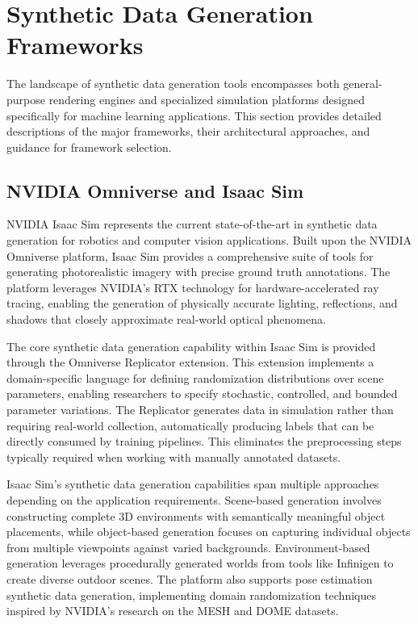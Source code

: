 \section{Synthetic Data Generation Frameworks}
\label{sec:frameworks}

The landscape of synthetic data generation tools encompasses both general-purpose rendering engines and specialized simulation platforms designed specifically for machine learning applications. This section provides detailed descriptions of the major frameworks, their architectural approaches, and guidance for framework selection.

\subsection{NVIDIA Omniverse and Isaac Sim}

NVIDIA Isaac Sim represents the current state-of-the-art in synthetic data generation for robotics and computer vision applications. Built upon the NVIDIA Omniverse platform, Isaac Sim provides a comprehensive suite of tools for generating photorealistic imagery with precise ground truth annotations. The platform leverages NVIDIA's RTX technology for hardware-accelerated ray tracing, enabling the generation of physically accurate lighting, reflections, and shadows that closely approximate real-world optical phenomena.

The core synthetic data generation capability within Isaac Sim is provided through the Omniverse Replicator extension. This extension implements a domain-specific language for defining randomization distributions over scene parameters, enabling researchers to specify stochastic, controlled, and bounded parameter variations. The Replicator generates data in simulation rather than requiring real-world collection, automatically producing labels that can be directly consumed by training pipelines. This eliminates the preprocessing steps typically required when working with manually annotated datasets.

Isaac Sim's synthetic data generation capabilities span multiple approaches depending on the application requirements. Scene-based generation involves constructing complete 3D environments with semantically meaningful object placements, while object-based generation focuses on capturing individual objects from multiple viewpoints against varied backgrounds. Environment-based generation leverages procedurally generated worlds from tools like Infinigen to create diverse outdoor scenes. The platform also supports pose estimation synthetic data generation, implementing domain randomization techniques inspired by NVIDIA's research on the MESH and DOME datasets.

